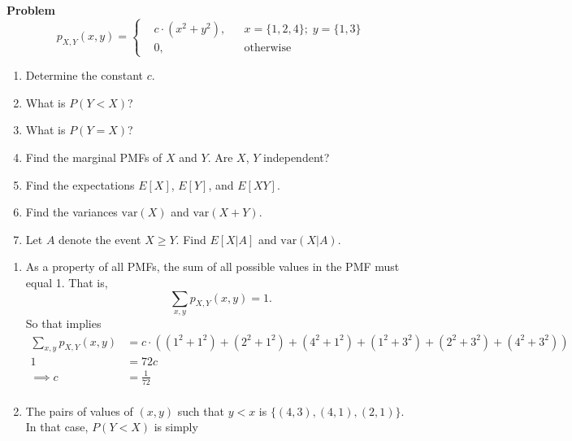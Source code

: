 \documentclass[12pt]{article}
\newenvironment{Ex}{\textbf{Problem}\vspace{.75em}\\}{}
\begin{document}
\begin{enumerate}
\begin{Ex}
\begin{equation*}
      \label{eq:2-question}
      p_{X,Y}(x,y) = \left\{
        \begin{aligned}
          & c \cdot (x^2 + y^2), && x=\{1,2,4\};\; y=\{1,3\} \\
          & 0, && \text{otherwise}
        \end{aligned}
      \right.
    \end{equation*}
    \begin{enumerate}
    \item Determine the constant $c$.
    \item What is $P(Y<X)$?
    \item What is $P(Y=X)$?
    \item Find the marginal PMFs of $X$ and $Y$. Are $X$, $Y$
      independent?
    \item Find the expectations $E[X]$, $E[Y]$, and $E[XY]$.
    \item Find the variances $\text{var}(X)$ and $\text{var}(X +Y)$.
    \item Let $A$ denote the event $X \ge Y$. Find $E[X|A]$ and
      $\text{var}(X|A)$.
    \end{enumerate}
    \begin{solution} \hfill
      \begin{enumerate}
      \item As a property of all PMFs, the sum of all possible
        values in the PMF must equal 1. That is,
        \begin{equation}
          \label{eq:2a-pmf-sum}
          \sum_{x,y} p_{X,Y}(x,y) = 1.
        \end{equation}
        So that implies
        \begin{equation}
          \label{eq:2a-pmf-sum-actual}
          \begin{aligned}
            \sum_{x,y} p_{X,Y}(x,y) &= c\cdot((1^2+1^2) + (2^2+1^2) +
            (4^2+1^2) + (1^2+3^2) + (2^2+3^2) + (4^2+3^2)) \\
            1 &= 72c \\
            \implies c&=\frac{1}{72} \\
          \end{aligned}
        \end{equation}
      \item The pairs of values of $(x,y)$ such that $y < x$
        is $\{(4,3),(4,1),(2,1)\}$. In that case, $P(Y < X)$ is
        simply
        \begin{equation}
          \label{eq:2b-sol}
          \begin{aligned}

\end{aligned}
\end{equation}
\end{enumerate}
\end{solution}
\end{Ex}
\end{enumerate}
\end{document}
